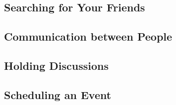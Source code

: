 \subsection{Searching for Your Friends}
\label{UserSearch}



\subsection{Communication between People}
\label{Communicating}



\subsection{Holding Discussions}
\label{Discussions}



\subsection{Scheduling an Event}
\label{Scheduling}

